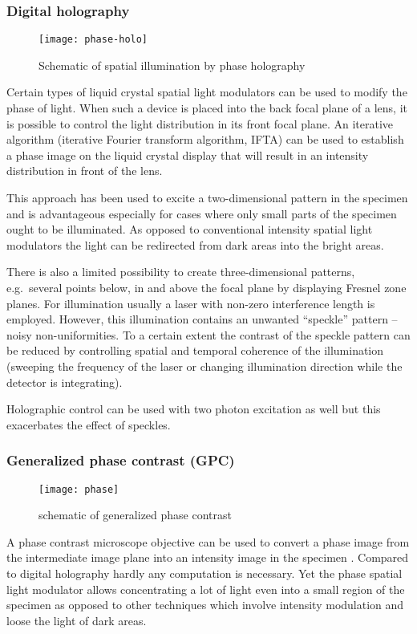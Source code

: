 \subsubsection{Digital holography}
\begin{figure}[!hbt]
  \centering
  \texttt{[image: phase-holo]} 
  \caption{Schematic of spatial illumination by phase holography
    }
  \label{fig:phase-holo}
\end{figure}
Certain types of liquid crystal spatial light modulators can be used
to modify the phase of light. When such a device is placed into the
back focal plane of a lens, it is possible to control the light
distribution in its front focal plane. An iterative algorithm
(iterative Fourier transform algorithm, IFTA) can be used to establish
a phase image on the liquid crystal display that will result in an
intensity distribution in front of the lens.


This approach has been used to excite a two-dimensional pattern in the
specimen \citep{Lutz2008,Zahid2010} and is advantageous especially for
cases where only small parts of the specimen ought to be
illuminated. As opposed to conventional intensity spatial light
modulators the light can be redirected from dark areas into the bright
areas.

There is also a limited possibility to create three-dimensional
patterns, e.g.\ several points below, in and above the focal plane by
displaying Fresnel zone planes.  For illumination usually a laser with
non-zero interference length is employed. However, this illumination
contains an unwanted ``speckle'' pattern -- noisy non-uniformities. To
a certain extent the contrast of the speckle pattern can be reduced by
controlling spatial and temporal coherence of the illumination
(sweeping the frequency of the laser or changing illumination
direction while the detector is integrating).

Holographic control can be used with two photon excitation as well
\citep{Nikolenko2008} %
but this exacerbates the effect of speckles.
\subsubsection{Generalized phase contrast (GPC)}
\begin{figure}[!hbt]
  \centering
  \texttt{[image: phase]} %
  \caption{schematic of generalized phase contrast \citep{Rodrigo2008}}
  \label{fig:phase}
\end{figure}
A phase contrast microscope objective  can be used to
convert a phase image from the intermediate image plane into an
intensity image in the specimen \citep{Rodrigo2008}. Compared to digital holography hardly any computation is
necessary. Yet the phase spatial light modulator allows concentrating
a lot of light even into a small region of the specimen as opposed to
other techniques which involve intensity modulation and loose the
light of dark areas.

